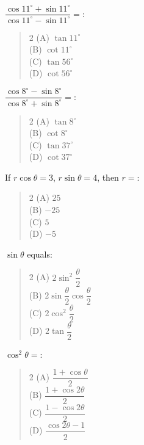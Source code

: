 \documentclass[11pt,a4paper]{article}
\begin{document}
\begin{mcqlist}
\item $\dfrac{\cos11^{\circ}+\sin11^{\circ}}{\cos11^{\circ}-\sin11^{\circ}} = $:
\begin{quote}\begin{multicols}{2}
\noindent (A) $\tan11^{\circ}$ \\
(B) $\cot11^{\circ}$ \\
(C) $\tan56^{\circ}$ \\
(D) $\cot56^{\circ}$
\end{multicols}\end{quote}

\item $\dfrac{\cos8^{\circ}-\sin8^{\circ}}{\cos8^{\circ}+\sin8^{\circ}} = $:
\begin{quote}\begin{multicols}{2}
\noindent (A) $\tan8^{\circ}$ \\
(B) $\cot8^{\circ}$ \\
(C) $\tan37^{\circ}$ \\
(D) $\cot37^{\circ}$
\end{multicols}\end{quote}

\item If $r\cos\theta=3$, $r\sin\theta=4$, then $r=$:
\begin{quote}\begin{multicols}{2}
\noindent (A) $25$ \\
(B) $-25$ \\
(C) $5$ \\
(D) $-5$
\end{multicols}\end{quote}

\item $\sin\theta$ equals:
\begin{quote}\begin{multicols}{2}
\noindent (A) $2\sin^2\dfrac{\theta}{2}$ \\
(B) $2\sin\dfrac{\theta}{2}\cos\dfrac{\theta}{2}$ \\
(C) $2\cos^2\dfrac{\theta}{2}$ \\
(D) $2\tan\dfrac{\theta}{2}$
\end{multicols}\end{quote}

\item $\cos^2\theta = $:
\begin{quote}\begin{multicols}{2}
\noindent (A) $\dfrac{1+\cos\theta}{2}$ \\
(B) $\dfrac{1+\cos2\theta}{2}$ \\
(C) $\dfrac{1-\cos2\theta}{2}$ \\
(D) $\dfrac{\cos2\theta-1}{2}$
\end{multicols}\end{quote}


\end{mcqlist}
\end{document}

